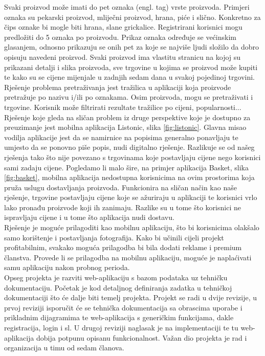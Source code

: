 		Svaki proizvod može imati do pet oznaka (engl. tag) vrste proizvoda. Primjeri oznaka su pekarski proizvod, mliječni proizvod, hrana, piće i slično. Konkretno za čips oznake bi mogle biti hrana, slane grickalice. Registrirani korisnici mogu predložiti do 5 oznaka po proizvodu. Prikaz oznaka određuje se većinskim glasanjem, odnosno prikazuju se onih pet za koje se najviše ljudi složilo da dobro opisuju navedeni proizvod. Svaki proizvod ima vlastitu stranicu na kojoj su prikazani detalji i slika proizvoda, sve trgovine u kojima se proizvod može kupiti te kako su se cijene mijenjale u zadnjih sedam dana u svakoj pojedinoj trgovini.\\
		
		Rješenje problema pretraživanja jest tražilica u aplikaciji koja proizvode pretražuje po nazivu i/ili po oznakama. Osim proizvoda, mogu se pretraživati i trgovine. Korisnik može filtrirati rezultate tražilice po cijeni, popularnosti...\\
		
		Rješenje koje gleda na sličan problem iz druge perspektive koje je dostupno za preuzimanje jest mobilna aplikacija Listonic, slika \ref{fig:listonic}. Glavna misao vodilja aplikacije jest da se namirnice na popisima generalno ponavljaju te umjesto da se ponovno piše popis, nudi digitalno rješenje. Razlikuje se od našeg rješenja tako što nije povezano s trgovinama koje postavljaju cijene nego korisnici sami zadaju cijene. Pogledamo li malo šire, na primjer aplikacija Basket, slika \ref{fig:basket}, mobilna aplikacija nedostupna korisnicima na ovim prostorima koja pruža uslugu dostavljanja proizvoda. Funkcionira na sličan način kao naše rješenje, trgovine postavljaju cijene koje se ažuriraju u aplikaciji te korisnici vrlo lako pronađu proizvode koji ih zanimaju. Razlike su u tome što korisnici ne ispravljaju cijene i u tome što aplikacija nudi dostavu.\\
		
		Rješenje je moguće prilagoditi kao mobilnu aplikaciju, što bi korisnicima olakšalo samo korištenje i postavljanja fotografija. Kako bi učinili cijeli projekt profitabilnim, svakako moguća prilagodba bi bila dodati reklame i premium članstva. Provede li se prilagodba na mobilnu aplikaciju, moguće je naplaćivati samu aplikaciju nakon probnog perioda.\\
		
		Opseg projekta je razviti web-aplikaciju s bazom podataka uz tehničku dokumentaciju. Početak je kod detaljnog definiranja zadatka u tehničkoj dokumentaciji što će dalje biti temelj projekta. Projekt se radi u dvije revizije, u prvoj reviziji isporučit će se tehnička dokumentacija sa obrascima uporabe i prikladnim dijagramima te web-aplikacija s generičkim funkcijama, dakle registracija, login i sl. U drugoj reviziji naglasak je na implementaciji te tu web-aplikacija dobija potpunu opisanu funkcionalnost. Važan dio projekta je rad i organizacija u timu od sedam članova.\\
		
